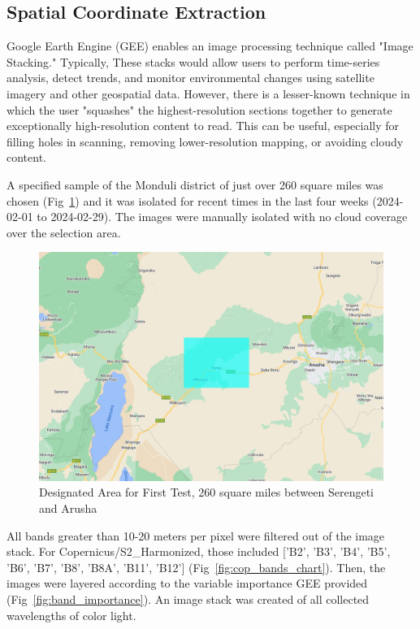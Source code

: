 \documentclass[10pt]{article}
\begin{document}

\subsection{Spatial Coordinate Extraction}
\label{procedure}

Google Earth Engine (GEE) enables an image processing technique called "Image Stacking." Typically, These stacks would allow users to perform time-series analysis, detect trends, and monitor environmental changes using satellite imagery and other geospatial data. However, there is a lesser-known technique in which the user "squashes" the highest-resolution sections together to generate exceptionally high-resolution content to read. This can be useful, especially for filling holes in scanning, removing lower-resolution mapping, or avoiding cloudy content. 

A specified sample of the Monduli district of just over 260 square miles was chosen (Fig~\ref{fig:designated_area}) and 
 it was isolated for recent times in the last four weeks (2024-02-01 to 2024-02-29). The images were manually isolated with no cloud coverage over the selection area.

\begin{figure} [H]
    \centering
    \includegraphics[width=1\linewidth]{images/studyarea.png}
    \caption{Designated Area for First Test, 260 square miles between Serengeti and Arusha}
    \label{fig:designated_area}
\end{figure}

All bands greater than 10-20 meters per pixel were filtered out of the image stack. For Copernicus/S2\_Harmonized, those included ['B2', 'B3', 'B4', 'B5', 'B6', 'B7', 'B8', 'B8A', 'B11', 'B12'] (Fig~\ref{fig:cop_bands_chart}). Then, the images were layered according to the variable importance GEE provided (Fig~\ref{fig:band_importance}). An image stack was created of all collected wavelengths of color light.
\end{document}
